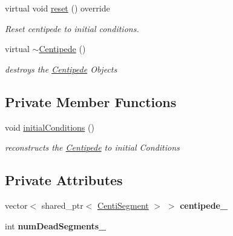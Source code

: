 \begin{DoxyCompactItemize}
\mbox{\label{class_centipede_a1fa0123a0ea08fb9b76305ec67692793}} 
virtual void \mbox{\hyperlink{class_centipede_a1fa0123a0ea08fb9b76305ec67692793}{reset}} () override
\begin{DoxyCompactList}\small\item\em Reset centipede to initial conditions. \end{DoxyCompactList}\item 
\mbox{\label{class_centipede_af887a67031a6c63897f3fad86a0076c2}} 
virtual \mbox{\hyperlink{class_centipede_af887a67031a6c63897f3fad86a0076c2}{$\sim$\+Centipede}} ()
\begin{DoxyCompactList}\small\item\em destroys the \mbox{\hyperlink{class_centipede}{Centipede}} Objects \end{DoxyCompactList}\end{DoxyCompactItemize}
\subsection*{Private Member Functions}
\begin{DoxyCompactItemize}
\item 
\mbox{\label{class_centipede_a8e63cbd49eea28d05a47ff898a4cea66}} 
void \mbox{\hyperlink{class_centipede_a8e63cbd49eea28d05a47ff898a4cea66}{initial\+Conditions}} ()
\begin{DoxyCompactList}\small\item\em reconstructs the \mbox{\hyperlink{class_centipede}{Centipede}} to initial Conditions \end{DoxyCompactList}\end{DoxyCompactItemize}
\subsection*{Private Attributes}
\begin{DoxyCompactItemize}
\item 
\mbox{\label{class_centipede_ab1427df87d3fb7b723c0fb8dce7e1e1c}} 
vector$<$ shared\+\_\+ptr$<$ \mbox{\hyperlink{class_centi_segment}{Centi\+Segment}} $>$ $>$ {\bfseries centipede\+\_\+}
\item 
\mbox{\label{class_centipede_a32527f4884c64cf17ea28310f9532f52}} 
int {\bfseries num\+Dead\+Segments\+\_\+}
\end{DoxyCompactItemize}


